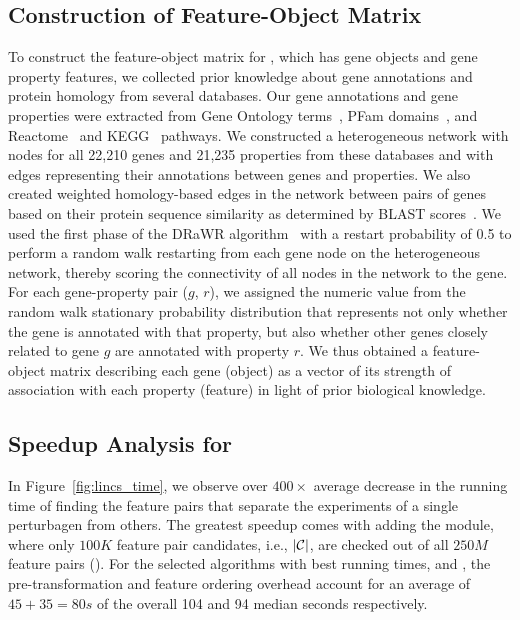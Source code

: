 \subsection{Construction of \msig Feature-Object Matrix} \label{app:msig_matrix}
To construct the feature-object matrix for \msig, which has gene objects and gene property features, we collected prior knowledge about gene annotations and protein homology from several databases.
Our gene annotations and gene properties were extracted from Gene Ontology terms~,
PFam domains~, and Reactome~  and KEGG~ pathways.
We constructed a heterogeneous  network with nodes for all 22,210 genes and 21,235 properties from these databases and with edges representing their annotations between genes and properties.
We also created weighted homology-based edges in the network between pairs of genes based on their protein sequence similarity as determined by BLAST scores~.
We used the first phase of the DRaWR algorithm~ with a restart probability of 0.5 to perform a random walk restarting from each gene node on the heterogeneous network, thereby scoring the connectivity of all nodes in the network to the gene.
For each gene-property pair ($g$, $r$), we assigned the numeric value from the random walk stationary probability distribution that represents not only whether the gene is annotated with that property, but also whether other genes closely related to gene $g$ are annotated with property $r$.
We thus obtained a feature-object matrix describing each gene (object) as a vector of its strength of association with each property (feature) in light of prior biological knowledge.


\subsection{Speedup Analysis for \lincs} \label{app:lincs}
In Figure~\ref{fig:lincs_time}, we observe over $400\times$ average decrease in the running time of finding the \topk feature pairs that separate the \lincs experiments of a single perturbagen from others. The greatest speedup comes with adding the \sampling module, where only $100K$ feature pair candidates, i.e., $|{\mathcal{C}}|$, are checked out of all $250M$ feature pairs (\timetbl). For the selected algorithms with best running times, \horiz and \vertic, the pre-transformation and feature ordering overhead account for an average of $45+35=80s$ of the overall 104 and 94 median seconds respectively.


